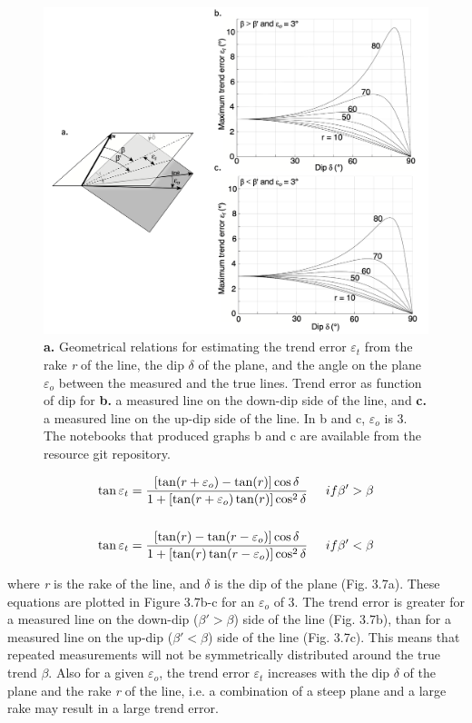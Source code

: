 \documentclass[a4paper , 12pt]{book}
\begin{document}
\begin{figure}[ht]
    \centering
    \includegraphics[width=13cm]{Figures/ch3f7.png}
    \caption{\textbf{a.} Geometrical relations for estimating the trend error $\varepsilon_t$ from the rake \textit{r} of the line, the dip $\delta$  of the plane, and the angle on the plane $\varepsilon_o$ between the measured and the true lines. Trend error as function of dip for \textbf{b.} a measured line on the down-dip side of the line, and \textbf{c.} a measured line on the up-dip side of the line. In b and c, $\varepsilon_o$ is 3\degree. The notebooks that produced graphs b and c are available from the resource git repository.}
\end{figure}

\begin{equation}
    \begin{split}
        \tan\varepsilon_t = \frac{[\tan(r+\varepsilon_o)-\tan(r)]\cos\delta}{1+[\tan(r+\varepsilon_o)\tan(r)]\cos^2\delta} \hspace{0.5cm} if \beta\text{$'$}>\beta\\ \\
        \tan\varepsilon_t = \frac{[\tan(r)-\tan(r-\varepsilon_o)]\cos\delta}{1+[\tan(r)\tan(r-\varepsilon_o)]\cos^2\delta} \hspace{0.5cm} if \beta\text{$'$}<\beta
    \end{split}
\end{equation}

where \textit{r} is the rake of the line, and $\delta$ is the dip of the plane (Fig. 3.7a). These equations are plotted in Figure 3.7b-c for an $\varepsilon_o$ of 3\degree. The trend error is greater for a measured line on the down-dip ($\beta\text{$'$} > \beta$) side of the line (Fig. 3.7b), than for a measured line on the up-dip ($\beta\text{$'$} < \beta$) side of the line (Fig. 3.7c). This means that repeated measurements will not be symmetrically distributed around the true trend $\beta$. Also for a given $\varepsilon_o$, the trend error $\varepsilon_t$ increases with the dip $\delta$ of the plane and the rake \textit{r} of the line, i.e. a combination of a steep plane and a large rake may result in a large trend error.
\end{document}
